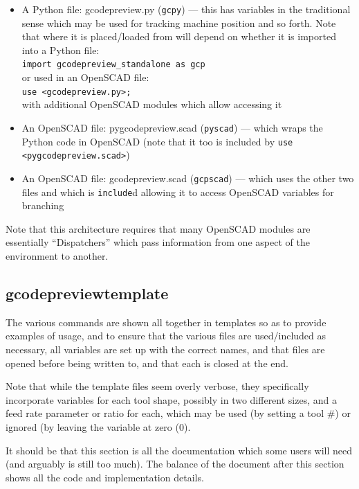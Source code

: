 \documentclass{ltxdoc}
\begin{document}
\begin{itemize}
\item A Python file: gcodepreview.py (\texttt{gcpy}) --- this has variables in the 
      traditional sense which may be used for tracking machine position and so forth. 
      Note that where it is placed/loaded from will depend on whether it is imported into
      a Python file:\\
      \verb|import gcodepreview_standalone as gcp|\\ 
      or used in an OpenSCAD file:\\
      \verb|use <gcodepreview.py>;|\\
      with additional OpenSCAD modules which allow accessing it
\item An OpenSCAD file: pygcodepreview.scad (\texttt{pyscad}) --- which wraps the Python code 
      in OpenSCAD (note that it too is included by \verb|use <pygcodepreview.scad>|)
\item An OpenSCAD file: gcodepreview.scad (\texttt{gcpscad}) --- which uses the other two files 
      and which is \texttt{include}d allowing it to access OpenSCAD variables for branching   
\end{itemize}

\noindent Note that this architecture requires that many OpenSCAD modules are essentially 
``Dispatchers'' which pass information from one aspect of the environment to another.

\subsection{gcodepreviewtemplate}

The various commands are shown all together in templates so as to provide examples of usage, and to ensure that the various files are used/included as necessary, all variables are set up with the correct names, and that files are opened before being written to, and that each is closed at the end. 

Note that while the template files seem overly verbose, they specifically incorporate variables for each tool shape, possibly in two different sizes, and a feed rate parameter or ratio for each, which may be used (by setting a tool \#) or ignored (by leaving the variable at zero (0).

It should be that this section is all the documentation which some users will need (and arguably is still too much). The balance of the document after this section shows all the code and implementation details.
\end{document}
